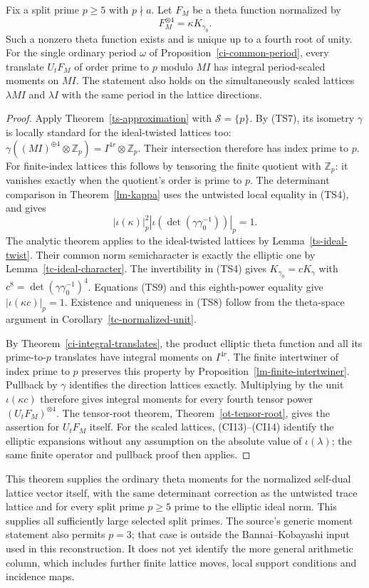 \begin{theorem}\label{ts-integral-theta}
Fix a split prime $p\ge5$ with $p\nmid a$.
Let $F_M$ be a theta function normalized by
\[
                         F_M^{\otimes4}=\kappa K_{\gamma_0}.
 \tag{TS8}
\]
Such a nonzero theta function exists and is unique up to a
fourth root of unity.
For the single ordinary period $\omega$ of
Proposition~\ref{ci-common-period}, every translate
$U_tF_M$ of order prime to $p$ modulo $MI$
has integral period-scaled moments on $MI$.
The statement also holds on the simultaneously scaled
lattices $\lambda MI$ and $\lambda I$ with the same
period in the lattice directions.
\end{theorem}
\begin{proof}
Apply Theorem~\ref{ts-approximation} with $\mathcal S=\{p\}$.
By (TS7), its isometry $\gamma$ is locally standard for
the ideal-twisted lattices too:
$\gamma((MI)^{\oplus4}\otimes\mathbb Z_p)
=I^{4r}\otimes\mathbb Z_p$.
Their intersection therefore has index prime to $p$.
For finite-index lattices this follows by tensoring the
finite quotient with $\mathbb Z_p$: it vanishes exactly
when the quotient's order is prime to $p$.
The determinant comparison in Theorem~\ref{lm-kappa}
uses the untwisted local equality in (TS4), and gives
\[
                 |\iota(\kappa)|_p^2
                 |\iota(\det(\gamma\gamma_0^{-1}))|_p=1.
 \tag{TS9}
\]
The analytic theorem applies to the ideal-twisted lattices
by Lemma~\ref{ts-ideal-twist}.  Their common norm
semicharacter is exactly the elliptic one by
Lemma~\ref{tc-ideal-character}.
The invertibility in (TS4) gives
$K_{\gamma_0}=cK_\gamma$ with
$c^8=\det(\gamma\gamma_0^{-1})^4$.
Equations (TS9) and this eighth-power equality give
$|\iota(\kappa c)|_p=1$.
Existence and uniqueness in (TS8) follow from the
theta-space argument in Corollary~\ref{tc-normalized-unit}.

By Theorem~\ref{ci-integral-translates}, the product
elliptic theta function and all its prime-to-$p$
translates have integral moments on $I^{4r}$.
The finite intertwiner of index prime to $p$ preserves
this property by Proposition~\ref{lm-finite-intertwiner}.
Pullback by $\gamma$ identifies the direction lattices
exactly.  Multiplying by the unit $\iota(\kappa c)$
therefore gives integral moments for every fourth
tensor power $(U_tF_M)^{\otimes4}$.
The tensor-root theorem, Theorem~\ref{ot-tensor-root},
gives the assertion for $U_tF_M$ itself.
For the scaled lattices, (CI13)--(CI14) identify the
elliptic expansions without any assumption on the
absolute value of $\iota(\lambda)$; the same finite
operator and pullback proof then applies.
\end{proof}

This theorem supplies the ordinary theta moments for the
normalized self-dual lattice vector itself, with the same
determinant correction as the untwisted trace lattice and
for every split prime $p\geq5$ prime to the elliptic
ideal norm.  This supplies all sufficiently large
selected split primes.  The source's generic moment
statement also permits $p=3$; that case is outside
the Bannai--Kobayashi input used in this reconstruction.
It does not yet identify the more general arithmetic
column, which includes further finite lattice moves,
local support conditions and incidence maps.


